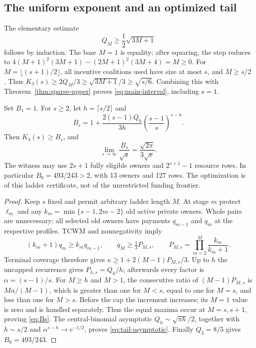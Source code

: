 \subsection{The uniform exponent and an optimized tail}
The elementary estimate
\begin{equation}\label{eq:central-bound}
 Q_M\ge\frac12\sqrt{3M+1}
\end{equation}
follows by induction. The base $M=1$ is equality; after squaring, the step
reduces to
$4(M+1)^2(3M+1)-(2M+1)^2(3M+4)=M\ge0$.
For $M=\lfloor(s+1)/2\rfloor$, all incentive coalitions used have size at
most $s$, and $M\ge s/2$. Thus
$K_3(s)\ge2Q_M/3\ge\sqrt{3M+1}/3\ge\sqrt{s/6}$.
Combining this with Theorem~\ref{thm:sparse-upper} proves
\eqref{eq:main-interval}, including $s=1$.

\begin{corollary}\label{cor:tail}
Set $B_1=1$. For $s\ge2$, let $h=\lceil s/2\rceil$ and
\begin{equation}\label{eq:Bs}
 B_s=1+\frac{2(s-1)Q_h}{3h}
            \left(\frac{s-1}{s}\right)^{s-h}.
\end{equation}
Then $K_3(s)\ge B_s$, and
\begin{equation}\label{eq:tail-asymptotic}
 \lim_{s\to\infty}\frac{B_s}{\sqrt s}
   =\frac{\sqrt{2\pi}}{3\sqrt e}.
\end{equation}
The witness may use $2s+1$ fully eligible owners and $2^{s+1}-1$ resource
rows. In particular $B_6=493/243>2$, with 13 owners and 127 rows.
The optimization is of this ladder certificate, not of the unrestricted
funding frontier.
\end{corollary}
\begin{proof}
Keep $s$ fixed and permit arbitrary ladder length $M$. At stage $m$ protect
$\ell_m$ and any $k_m=\min\{s-1,2m-2\}$ old active private owners. Whole
pairs are unnecessary; all selected old owners have payments $q_{m-1}$ and
$q_m$ at the respective profiles. TCWM and nonnegativity imply
\[
 (k_m+1)q_m\ge k_m q_{m-1},\qquad
 q_M\ge\tfrac13 P_{M,s},\qquad
 P_{M,s}=\prod_{m=2}^M\frac{k_m}{k_m+1}.
\]
Terminal coverage therefore gives
$\kappa\ge1+2(M-1)P_{M,s}/3$.
Up to $h$ the uncapped recurrence gives $P_{h,s}=Q_h/h$; afterwards every
factor is $\alpha=(s-1)/s$. For $M\ge h$ and $M>1$, the consecutive ratio
of $(M-1)P_{M,s}$ is $M\alpha/(M-1)$, which is greater than one for $M<s$,
equal to one for $M=s$, and less than one for $M>s$.
Before the cap the increment increases; its $M=1$ value is zero and is
handled separately. Thus the equal maxima occur at $M=s,s+1$, proving
\eqref{eq:Bs}. The central-binomial asymptotic
$Q_h\sim\sqrt{\pi h}/2$, together with $h\sim s/2$ and
$\alpha^{s-h}\to e^{-1/2}$, proves \eqref{eq:tail-asymptotic}.
Finally $Q_3=8/5$ gives $B_6=493/243$.
\end{proof}

